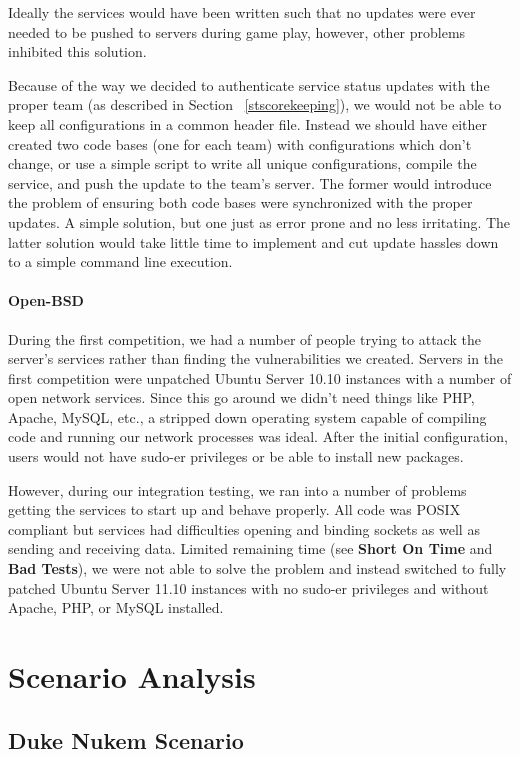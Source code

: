 \documentclass[10pt]{article}
\begin{document}
Ideally the services would have been written such that no updates were ever
needed to be pushed to servers during game play, however, other problems
inhibited this solution. 

Because of the way we decided to authenticate service status updates with
the proper team (as described in Section ~\ref{stscorekeeping}), we would
not be able to keep all configurations in a common header file. Instead we
should have either created two code bases (one for each team) with
configurations which don't change, or use a simple script to write all unique
configurations, compile the service, and push the update to the team's server.
The former would introduce the problem of ensuring both code bases were
synchronized with the proper updates. A simple solution, but one just as error
prone and no less irritating. The latter solution would take little time to
implement and cut update hassles down to a simple command line execution.

\paragraph*{Open-BSD} During the first competition, we had a
number of people trying to attack the server's services rather than finding the vulnerabilities
we created. Servers in the first competition were unpatched Ubuntu Server 10.10
instances with a number of open network services. Since this go around we didn't
need things like PHP, Apache, MySQL, etc., a stripped down operating system
capable of compiling code and running our network processes was ideal. After the
initial configuration, users would not have sudo-er privileges or be able to
install new packages. 

However, during our integration testing, we ran into a number of problems
getting the services to start up and behave properly. All code was POSIX
compliant but services had difficulties opening and binding sockets as well as
sending and receiving data. Limited remaining time (see \textbf{Short On Time}
and \textbf{Bad Tests}), we were not able to solve the problem and instead
switched to fully patched Ubuntu Server 11.10 instances with no sudo-er
privileges and without Apache, PHP, or MySQL installed. 

\section{Scenario Analysis}

\subsection{Duke Nukem Scenario}
\end{document}
